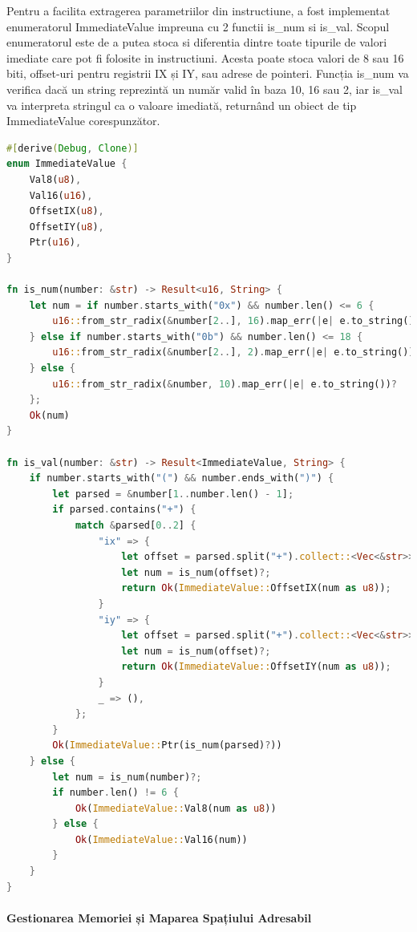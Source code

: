 \documentclass[titlepage,12pt]{article}
\DeclareRobustCommand{\code}[1]{{\ttfamily\small #1}}
\begin{document}
Pentru a facilita extragerea parametriilor din instructiune, a fost implementat enumeratorul \code{ImmediateValue} impreuna cu 2 functii \code{is\_num} si \code{is\_val}. Scopul enumeratorul este de a putea stoca si diferentia dintre toate tipurile de valori imediate care pot fi folosite in instructiuni. Acesta poate stoca valori de 8 sau 16 biti, offset-uri pentru registrii IX și IY, sau adrese de pointeri. Funcția \code{is\_num} va verifica dacă un string reprezintă un număr valid în baza 10, 16 sau 2, iar \code{is\_val} va interpreta stringul ca o valoare imediată, returnând un obiect de tip \code{ImmediateValue} corespunzător.

\begin{lstlisting}[language=Rust,caption={Enumerator ImmediateValue},label={lst:immediatevalue-enum}]
#[derive(Debug, Clone)]
enum ImmediateValue {
    Val8(u8),
    Val16(u16),
    OffsetIX(u8),
    OffsetIY(u8),
    Ptr(u16),
}

fn is_num(number: &str) -> Result<u16, String> {
    let num = if number.starts_with("0x") && number.len() <= 6 {
        u16::from_str_radix(&number[2..], 16).map_err(|e| e.to_string())?
    } else if number.starts_with("0b") && number.len() <= 18 {
        u16::from_str_radix(&number[2..], 2).map_err(|e| e.to_string())?
    } else {
        u16::from_str_radix(&number, 10).map_err(|e| e.to_string())?
    };
    Ok(num)
}

fn is_val(number: &str) -> Result<ImmediateValue, String> {
    if number.starts_with("(") && number.ends_with(")") {
        let parsed = &number[1..number.len() - 1];
        if parsed.contains("+") {
            match &parsed[0..2] {
                "ix" => {
                    let offset = parsed.split("+").collect::<Vec<&str>>()[1];
                    let num = is_num(offset)?;
                    return Ok(ImmediateValue::OffsetIX(num as u8));
                }
                "iy" => {
                    let offset = parsed.split("+").collect::<Vec<&str>>()[1];
                    let num = is_num(offset)?;
                    return Ok(ImmediateValue::OffsetIY(num as u8));
                }
                _ => (),
            };
        }
        Ok(ImmediateValue::Ptr(is_num(parsed)?))
    } else {
        let num = is_num(number)?;
        if number.len() != 6 {
            Ok(ImmediateValue::Val8(num as u8))
        } else {
            Ok(ImmediateValue::Val16(num))
        }
    }
}
\end{lstlisting}

\paragraph{Gestionarea Memoriei și Maparea Spațiului Adresabil}
\end{document}
